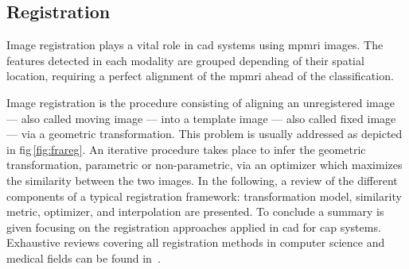 \subsection{Registration}\label{subsec:chp3:img-reg:reg}


Image registration plays a vital role in \ac{cad} systems using \ac{mpmri}
images.
The features
detected in each modality are grouped depending of their spatial location,
requiring a perfect alignment of the \ac{mpmri} ahead of the classification.

Image registration is the procedure consisting of aligning an unregistered
image --- also called moving image --- into a template image --- also called
fixed image --- via a geometric transformation.
This problem is usually addressed as depicted in \ac{fig}\,\ref{fig:frareg}.
An iterative procedure takes place to infer the geometric transformation,
parametric or non-parametric, via an optimizer which maximizes the similarity
between the two images.
In the following, a review of the different components of a typical
registration framework: transformation model, similarity metric, optimizer, and
interpolation are presented.
To conclude a summary is given focusing on the registration approaches applied in \ac{cad} for \ac{cap} systems.
Exhaustive reviews covering all registration methods in computer science and
medical fields can be found in~\cite{Maintz1998,Zitova2003}.

